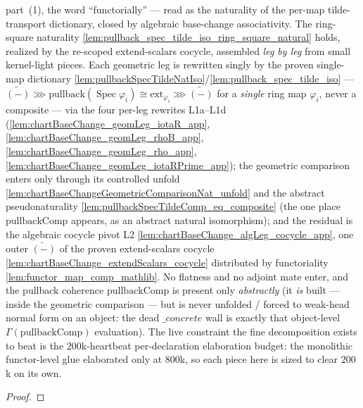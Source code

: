 \begin{lemma}
{  part~(1), the word ``functorially'' — read as the naturality of the per-map tilde-transport
  dictionary, closed by algebraic base-change associativity.}
  The ring-square naturality \cref{lem:pullback_spec_tilde_iso_ring_square_natural} holds, realized
  by the re-scoped extend-scalars cocycle, assembled \emph{leg by leg} from small kernel-light pieces.
  Each geometric leg is rewritten singly by the proven single-map dictionary
  \cref{lem:pullbackSpecTildeNatIso}/\cref{lem:pullback_spec_tilde_iso} —
  \(\widetilde{(-)} \ggg \mathrm{pullback}(\operatorname{Spec}\varphi_i) \cong \mathrm{ext}_{\varphi_i}
  \ggg \widetilde{(-)}\) for a \emph{single} ring map \(\varphi_i\), never a composite — via the four
  per-leg rewrites L1a--L1d (\cref{lem:chartBaseChange_geomLeg_iotaR_app},
  \cref{lem:chartBaseChange_geomLeg_rhoB_app}, \cref{lem:chartBaseChange_geomLeg_rho_app},
  \cref{lem:chartBaseChange_geomLeg_iotaRPrime_app}); the geometric comparison enters only through its
  controlled unfold \cref{lem:chartBaseChangeGeometricComparisonNat_unfold} and the abstract
  pseudonaturality \cref{lem:pullbackSpecTildeComp_eq_composite} (the one place
  \(\mathrm{pullbackComp}\) appears, as an abstract natural isomorphism); and the residual is the
  algebraic cocycle pivot L2 \cref{lem:chartBaseChange_algLeg_cocycle_app}, one outer
  \(\widetilde{(-)}\) of the proven extend-scalars cocycle
  \cref{lem:chartBaseChange_extendScalars_cocycle} distributed by functoriality
  \cref{lem:functor_map_comp_mathlib}. No flatness and no adjoint mate enter, and the pullback
  coherence \(\mathrm{pullbackComp}\) is present only \emph{abstractly} (it \emph{is} built — inside the
  geometric comparison — but is never unfolded / forced to weak-head normal form on an object: the dead
  \(\_concrete\) wall is exactly that object-level \(\Gamma(\mathrm{pullbackComp})\) evaluation). The
  live constraint the fine decomposition exists to beat is the \(200\)k-heartbeat per-declaration
  elaboration budget: the monolithic functor-level glue elaborated only at \(800\)k, so each piece here
  is sized to clear \(200\)k on its own.
  \begin{proof}
\end{proof}
\end{lemma}
